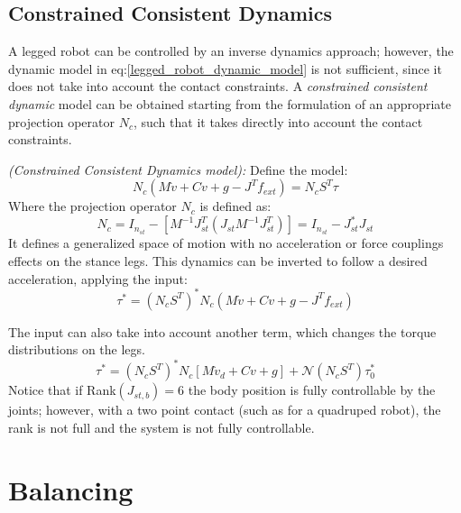 \subsection{Constrained Consistent Dynamics}
A legged robot can be controlled by an inverse dynamics approach; however, the dynamic model in eq:\ref{legged_robot_dynamic_model} is not sufficient, since it does not take into account the contact constraints. A \textit{constrained consistent dynamic} model can be obtained starting from the formulation of an appropriate projection operator $N_c$, such that it takes directly into account the contact constraints. 
\begin{definition}
    \textit{(Constrained Consistent Dynamics model):} Define the model:
    \begin{equation}\label{constrained_consistent_dynamic_model}
        N_c\left(M\dot{v}+Cv+g-J^{T}f_{ext}\right)=N_cS^{T}\tau
    \end{equation}
    Where the projection operator $N_c$ is defined as:
    \begin{equation}\label{legged_robotics_dynamically_consistent_projection_operator}
        N_c=I_{n_{st}}-\left[M^{-1}J_{st}^{T}\left(J_{st}M^{-1}J_{st}^{T}\right)\right]=I_{n_{st}}-J_{st}^{*}J_{st}
    \end{equation}
    It defines a generalized space of motion with no acceleration or force couplings effects on the stance legs. This dynamics can be inverted to follow a desired acceleration, applying the input:
    \begin{equation}\label{legged_robot_inverted_dynamics_input}
        \tau^*=\left(N_cS^T\right)^*N_c\left(M\dot{v}+Cv+g-J^{T}f_{ext}\right)
    \end{equation}
\end{definition}
The input can also take into account another term, which changes the torque distributions on the legs.
\begin{equation}\label{legged_robot_inverted_dynamics_augmented_input}
    \tau^*=\left(N_cS^T\right)^*N_c\left[M\dot{v}_d+Cv+g\right]+\mathcal{N}\left(N_cS^T\right)\tau_0^*
\end{equation}
Notice that if Rank$(J_{st,b})=6$ the body position is fully controllable by the joints; however, with a two point contact (such as for a quadruped robot), the rank is not full and the system is not fully controllable.
\section{Balancing}
